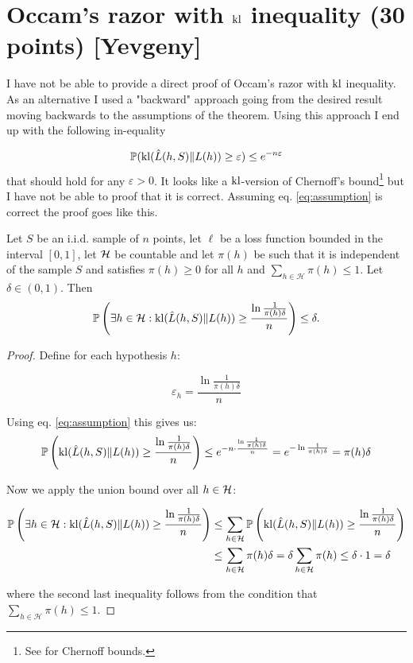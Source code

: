 \section{Occam's razor with \texorpdfstring{$\operatorname{kl}$}{kl} inequality (30 points) [Yevgeny]}

I have not be able to provide a direct proof of Occam's razor with $\operatorname{kl}$ inequality.
As an alternative I used a "backward" approach going from the desired result moving backwards to the assumptions of the theorem. Using this approach I end up with the following in-equality

\begin{equation}\label{eq:assumption}
\P(\kl(\hat{L}(h,S)\|L(h)) \geq \varepsilon) \leq e^{-n\varepsilon}
\end{equation}
that should hold for any $\varepsilon > 0$. It looks like a $\operatorname{kl}$-version of Chernoff's bound\footnote{See \cite{mitzenmacherProbabilityComputingRandomized2005} for Chernoff bounds.} but I have not be able to proof that it is correct. Assuming eq. \ref{eq:assumption} is correct the proof goes like this.

\begin{theorem}
Let $S$ be an i.i.d. sample of $n$ points, let $\ell$ be a loss function bounded in the interval $[0, 1]$, let $\mathcal H$ be countable and let $\pi(h)$ be such that it is independent of the sample $S$ and satisfies $\pi(h) \geq 0$ for all $h$ and $\sum_{h\in\mathcal{H}} \pi(h) \leq 1$. Let $\delta \in (0,1)$. Then
\begin{equation*}
\P\left(\exists h \in \HH : \kl(\hat{L}(h, S)\|L(h)) \geq \frac{\ln \frac{1}{\pi(h)\delta}}{n}\right) \leq \delta.
\end{equation*}
\end{theorem}

\begin{proof}
Define for each hypothesis $h$:

\begin{equation*}
\varepsilon_h = \frac{\ln \frac{1}{\pi(h)\delta}}{n}
\end{equation*}

Using eq. \ref{eq:assumption} this gives us:
\begin{equation*}
\P\left(\kl(\hat{L}(h,S)\|L(h)) \geq \frac{\ln \frac{1}{\pi(h)\delta}}{n}\right) \leq e^{-n \cdot \frac{\ln \frac{1}{\pi(h)\delta}}{n}} 
= e^{-\ln \frac{1}{\pi(h)\delta}} 
= \pi(h)\delta
\end{equation*}

Now we apply the union bound over all $h \in \mathcal H$:

\begin{align*}
\P\left(\exists h \in \HH : \kl(\hat{L}(h,S)\|L(h)) \geq \frac{\ln \frac{1}{\pi(h)\delta}}{n}\right) &\leq \sum_{h \in \HH} \P\left(\kl(\hat{L}(h,S)\|L(h)) \geq \frac{\ln \frac{1}{\pi(h)\delta}}{n}\right) \\
&\leq \sum_{h \in \HH} \pi(h)\delta 
= \delta \sum_{h \in \HH} \pi(h) 
\leq \delta \cdot 1 
= \delta
\end{align*}

where the second last inequality follows from the condition that $\sum_{h \in \mathcal{H}} \pi(h) \leq 1$.
\end{proof}



